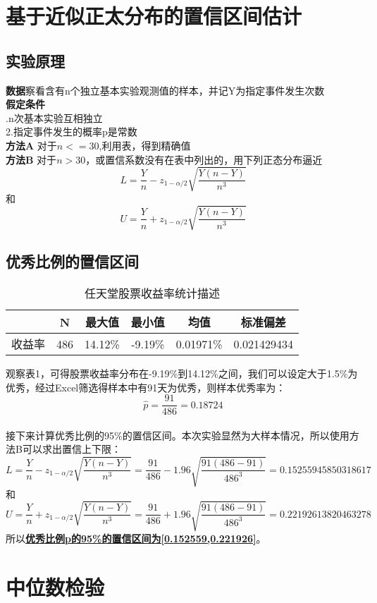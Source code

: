 \documentclass[a4paper, 11pt]{article}
\begin{document}
	\section{基于近似正太分布的置信区间估计}
	\subsection{实验原理}
	\noindent\textbf{数据}\quad 察看含有n个独立基本实验观测值的样本，并记Y为指定事件发生次数
	\\\textbf{假定条件}\\
		 .\;n次基本实验互相独立\\
		 \indent2.指定事件发生的概率p是常数
    \\\textbf{方法A} 对于$ n<=30 $,利用表，得到精确值
	\\\textbf{方法B} 对于$ n>30 $，或置信系数没有在表中列出的，用下列正态分布逼近
	$$  L=\frac{Y}{n}-z_{1-\alpha/2}\sqrt{\frac{Y(n-Y)}{n^3}}  $$
	和
	$$  U=\frac{Y}{n}+z_{1-\alpha/2}\sqrt{\frac{Y(n-Y)}{n^3}}  $$
	\subsection{优秀比例的置信区间}
	\begin{table}[!h]
	\centering
	\begin{tabular}{|c|c|c|c|c|c|}
	 \hline
	 &N&最大值&最小值&均值&标准偏差\\
	 \hline
	 收益率&486&14.12\%&-9.19\%&0.01971\%&0.021429434\\
	 \hline
	\end{tabular}
	\caption{任天堂股票收益率统计描述}
	\end{table}
	观察表1，可得股票收益率分布在-9.19\%到14.12\%之间，我们可以设定大于1.5\%为优秀，经过Excel筛选得样本中有91天为优秀，则样本优秀率为：
	$$ \hat{p}=\frac{91}{486}=0.18724 $$
	\\接下来计算优秀比例的95\%的置信区间。本次实验显然为大样本情况，所以使用方法B可以求出置信上下限：
	$$  L=\frac{Y}{n}-z_{1-\alpha/2}\sqrt{\frac{Y(n-Y)}{n^3}}=\frac{91}{486}-1.96\sqrt{\frac{91(486-91)}{486^3}}=0.15255945850318617  $$
	和
	$$  U=\frac{Y}{n}+z_{1-\alpha/2}\sqrt{\frac{Y(n-Y)}{n^3}}=\frac{91}{486}+1.96\sqrt{\frac{91(486-91)}{486^3}}=0.22192613820463278  $$
	所以\textbf{\underline{优秀比例p的95\%的置信区间为[0.152559,0.221926]}}。
	\section{中位数检验}
\end{document}

